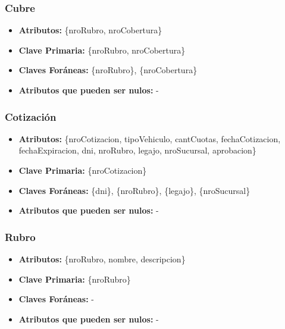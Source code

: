 \documentclass[a4paper,11pt]{article}
\begin{document}
\subsubsection{Cubre}

\begin{itemize}

	\item \textbf{Atributos:} \{nroRubro, nroCobertura\}

	\item \textbf{Clave Primaria:} \{nroRubro, nroCobertura\}
	
	\item \textbf{Claves Foráneas:} \{nroRubro\}, \{nroCobertura\}

	\item \textbf{Atributos que pueden ser nulos:} -
	
\end{itemize}


\subsubsection{Cotización}

\begin{itemize}

	\item \textbf{Atributos:} \{nroCotizacion, tipoVehiculo, cantCuotas, fechaCotizacion, fechaExpiracion, dni, nroRubro, legajo, nroSucursal, aprobacion\}
	
	\item \textbf{Clave Primaria:} \{nroCotizacion\}
	
	\item \textbf{Claves Foráneas:} \{dni\}, \{nroRubro\}, \{legajo\}, \{nroSucursal\}

	\item \textbf{Atributos que pueden ser nulos:} -
	
\end{itemize}

\subsubsection{Rubro}

\begin{itemize}

	\item \textbf{Atributos:} \{nroRubro, nombre, descripcion\}
	
	\item \textbf{Clave Primaria:} \{nroRubro\}
	
	\item \textbf{Claves Foráneas:} -

	\item \textbf{Atributos que pueden ser nulos:} -
	
\end{itemize}
\end{document}
